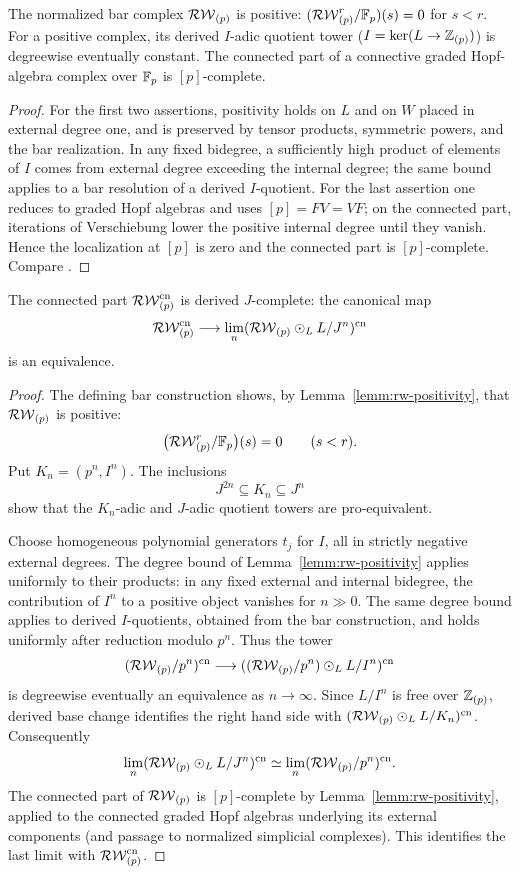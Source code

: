 \begin{lemma}\label{lemm:rw-positivity}
The normalized bar complex $\mathcal{RW}_{(p)}$ is positive: $ (\mathcal{RW}_{(p)}^r/\mathbb{F}_p)(s)=0$ for $s<r$. For a positive complex, its derived $I$-adic quotient tower ($I=\ker(L\to\mathbb{Z}_{(p)})$) is degreewise eventually constant. The connected part of a connective graded Hopf-algebra complex over $\mathbb{F}_p$ is $[p]$-complete.
\end{lemma}
\begin{proof}
For the first two assertions, positivity holds on $L$ and on $W$ placed in external degree one, and is preserved by tensor products, symmetric powers, and the bar realization. In any fixed bidegree, a sufficiently high product of elements of $I$ comes from external degree exceeding the internal degree; the same bound applies to a bar resolution of a derived $I$-quotient. For the last assertion one reduces to graded Hopf algebras and uses $[p]=FV=VF$; on the connected part, iterations of Verschiebung lower the positive internal degree until they vanish. Hence the localization at $[p]$ is zero and the connected part is $[p]$-complete. Compare \cite[Proposition 9.1]{goerss-dieudonne}.
\end{proof}

\begin{lemma}\label{lemm:joint-completeness}

The connected part $\mathcal{RW}_{(p)}^{\mathrm{cn}}$ is derived $J$-complete: the canonical map
\[\mathcal{RW}_{(p)}^{\mathrm{cn}}\longrightarrow\operatorname*{lim}_n(\mathcal{RW}_{(p)}\odot_L L/J^n)^{\mathrm{cn}}\]
is an equivalence.
\end{lemma}
\begin{proof}
The defining bar construction shows, by Lemma~\ref{lemm:rw-positivity}, that $\mathcal{RW}_{(p)}$ is positive:
\[\big(\mathcal{RW}_{(p)}^r/\mathbb{F}_p\big)(s)=0\qquad(s<r).\]
Put $K_n=(p^n,I^n)$. The inclusions
\[J^{2n}\subseteq K_n\subseteq J^n\]
show that the $K_n$-adic and $J$-adic quotient towers are pro-equivalent.

Choose homogeneous polynomial generators $t_j$ for $I$, all in strictly negative external degrees. The degree bound of Lemma~\ref{lemm:rw-positivity} applies uniformly to their products: in any fixed external and internal bidegree, the contribution of $I^n$ to a positive object vanishes for $n\gg0$. The same degree bound applies to derived $I$-quotients, obtained from the bar construction, and holds uniformly after reduction modulo $p^n$. Thus the tower
\[(\mathcal{RW}_{(p)}/p^n)^{\mathrm{cn}}\longrightarrow ((\mathcal{RW}_{(p)}/p^n)\odot_L L/I^n)^{\mathrm{cn}}\]
is degreewise eventually an equivalence as $n\to\infty$. Since $L/I^n$ is free over $\mathbb{Z}_{(p)}$, derived base change identifies the right hand side with $(\mathcal{RW}_{(p)}\odot_L L/K_n)^{\mathrm{cn}}$. Consequently
\[\operatorname*{lim}_n(\mathcal{RW}_{(p)}\odot_L L/J^n)^{\mathrm{cn}}\simeq\operatorname*{lim}_n(\mathcal{RW}_{(p)}/p^n)^{\mathrm{cn}}.\]
The connected part of $\mathcal{RW}_{(p)}$ is $[p]$-complete by Lemma~\ref{lemm:rw-positivity}, applied to the connected graded Hopf algebras underlying its external components (and passage to normalized simplicial complexes). This identifies the last limit with $\mathcal{RW}_{(p)}^{\mathrm{cn}}$.
\end{proof}

